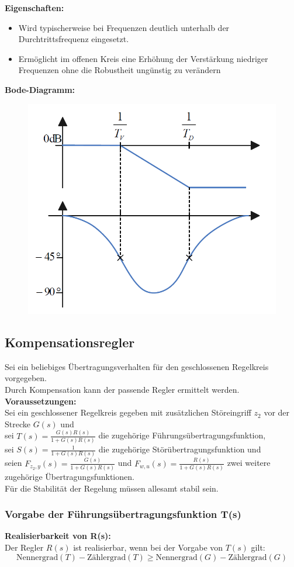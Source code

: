 \documentclass[10pt,a4paper]{article}
\begin{document}
\textbf{Eigenschaften:}
\begin{itemize}
	\item Wird typischerweise bei Frequenzen deutlich unterhalb der Durchtrittsfrequenz eingesetzt.
	\item Ermöglicht im offenen Kreis eine Erhöhung der Verstärkung niedriger Frequenzen ohne die Robustheit ungünstig zu verändern
\end{itemize}

\textbf{Bode-Diagramm:}
\begin{figure}[H]
	\includegraphics[width = 0.4\columnwidth]{imgs/lag-glied.png}
\end{figure}

\subsection{Kompensationsregler}
Sei ein beliebiges Übertragungsverhalten für den geschlossenen Regelkreis vorgegeben. \\
Durch Kompensation kann der passende Regler ermittelt werden. \\

\textbf{Voraussetzungen:} \\
Sei ein geschlossener Regelkreis gegeben mit zusätzlichen Störeingriff $z_2$ vor der Strecke $G(s)$ und \\
sei $T(s) = \frac{G(s)R(s)}{1 + G(s)R(s)}$ die zugehörige Führungsübertragungsfunktion, \\
sei $S(s) = \frac{1}{1 + G(s)R(s)}$ die zugehörige Störübertragungsfunktion und \\
seien $F_{z_2,y}(s) = \frac{G(s)}{1 + G(s)R(s)}$ und $F_{w,u}(s) = \frac{R(s)}{1 + G(s)R(s)}$ zwei weitere zugehörige Übertragungsfunktionen. \\
Für die Stabilität der Regelung müssen allesamt stabil sein.

\subsubsection{Vorgabe der Führungsübertragungsfunktion T(s)}
\textbf{Realisierbarkeit von R(s):} \\
Der Regler $R(s)$ ist realisierbar, wenn bei der Vorgabe von $T(s)$ gilt:
$$
	\text{Nennergrad}(T) - \text{Zählergrad}(T) ≥ \text{Nennergrad}(G) - \text{Zählergrad}(G)
$$
\end{document}
